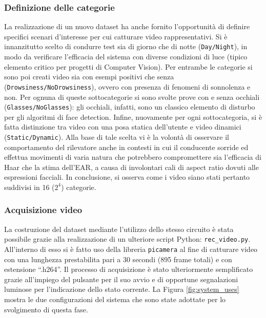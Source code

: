 \documentclass[12pt]{article}
\newcommand{\quotes}[1]{``#1''}
\begin{document}
\subsubsection{Definizione delle categorie}
La realizzazione di un nuovo dataset ha anche fornito l'opportunità di definire specifici scenari d'interesse per cui catturare video rappresentativi. Si è innanzitutto scelto di condurre test sia di giorno che di notte (\texttt{Day/Night}), in modo da verificare l'efficacia del sistema con diverse condizioni di luce (tipico elemento critico per progetti di Computer Vision). Per entrambe le categorie si sono poi creati video sia con esempi positivi che senza (\texttt{Drowsiness/NoDrowsiness}), ovvero con presenza di fenomeni di sonnolenza e non. Per ognuna di queste sottocategorie si sono svolte prove con e senza occhiali (\texttt{Glasses/NoGlasses}): gli occhiali, infatti, sono un classico elemento di disturbo per gli algoritmi di face detection. Infine, nuovamente per ogni sottocategoria, si è fatta distinzione tra video con una posa statica dell'utente e video dinamici (\texttt{Static/Dynamic}). Alla base di tale scelta vi è la volontà di osservare il comportamento del rilevatore anche in contesti in cui il conducente sorride ed effettua movimenti di varia natura che potrebbero compromettere sia l'efficacia di Haar che la stima dell'EAR, a causa di involontari cali di aspect ratio dovuti alle espressioni facciali. In conclusione, si osserva come i video siano stati pertanto suddivisi in 16 ($2^4$) categorie.

\subsubsection{Acquisizione video}
La costruzione del dataset mediante l'utilizzo dello stesso circuito è stata possibile grazie alla realizzazione di un ulteriore script Python: \texttt{rec\_video.py}. All'interno di esso si è fatto uso della libreria \texttt{picamera} al fine di catturare video con una lunghezza prestabilita pari a 30 secondi (895 frame totali) e con estensione \quotes{.h264}. Il processo di acquisizione è stato ulteriormente semplificato grazie all'impiego del pulsante per il suo avvio e di opportune segnalazioni luminose per l'indicazione dello stato corrente. La Figura \ref{fig:system_uses} mostra le due configurazioni del sistema che sono state adottate per lo svolgimento di questa fase.\\
\end{document}
